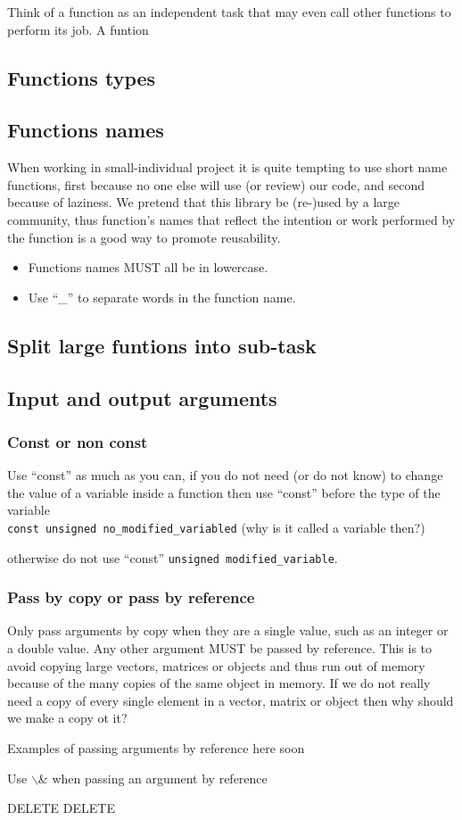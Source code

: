 \documentclass[11pt]{article}
\begin{document}
Think of a function as an independent task that may even call other
functions to perform its job. A funtion

\subsection{Functions types}

\subsection{Functions names}
When working in small-individual project it is quite tempting to use
short name functions, first because no one else will use (or review)
our code, and second because of laziness. We pretend that this library
be (re-)used by a large community, thus function's names that reflect
the intention or work performed by the function is a good way to
promote reusability.

\begin{itemize}
  \item Functions names MUST all be in lowercase.
  \item Use ``\_'' to separate words in the function name.
\end{itemize}

\subsection{Split large funtions into sub-task}

\subsection{Input and output arguments}

\subsubsection{Const or non const}
Use ``const'' as much as you can, if you do not need (or do not know)
to change the value of a variable inside a function then use ``const''
before the type of the variable\\

\texttt{const unsigned no\_modified\_variabled} (why is it called a
variable then?)

otherwise do not use ``const'' \texttt{unsigned modified\_variable}.


\subsubsection{Pass by copy or pass by reference}
Only pass arguments by copy when they are a single value, such as an
integer or a double value. Any other argument MUST be passed by
reference. This is to avoid copying large vectors, matrices or objects
and thus run out of memory because of the many copies of the same
object in memory. If we do not really need a copy of every single
element in a vector, matrix or object then why should we make a copy
ot it?

Examples of passing arguments by reference here soon

Use $\backslash$& when passing an argument by reference

DELETE DELETE
\end{document}
